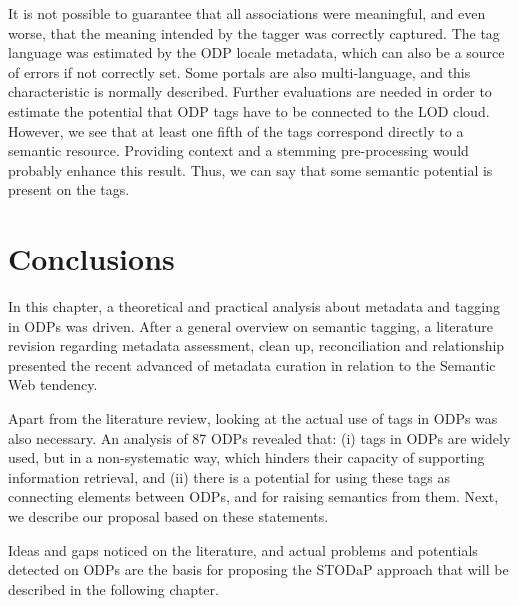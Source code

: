 

It is not possible to guarantee that all associations were meaningful, and even worse, that the meaning intended by the tagger was correctly captured.
The tag language was estimated by the ODP locale metadata, which can also be a source of errors if not correctly set.
Some portals are also multi-language, and this characteristic is normally described.
Further evaluations are needed in order to estimate the potential that ODP tags have to be connected to the LOD cloud.
However, we see that at least one fifth of the tags correspond directly to a semantic resource.
Providing context and a stemming pre-processing would probably enhance this result.
Thus, we can say that some semantic potential is present on the tags.


\section{Conclusions}

In this chapter, a theoretical and practical analysis about metadata and tagging in ODPs was driven.
After a general overview on semantic tagging, a literature revision regarding metadata assessment, clean up, reconciliation and relationship presented the recent advanced of metadata curation in relation to the Semantic Web tendency.

Apart from the literature review, looking at the actual use of tags in ODPs was also necessary.
An analysis of 87 ODPs revealed that: (i) tags in ODPs are widely used, but in a non-systematic way, which hinders their capacity of supporting information retrieval, and (ii) there is a potential for using these tags as connecting elements between ODPs, and for raising semantics from them.
Next, we describe our proposal based on these statements.

Ideas and gaps noticed on the literature, and actual problems and potentials detected on ODPs are the basis for proposing the STODaP approach that will be described in the following chapter.



